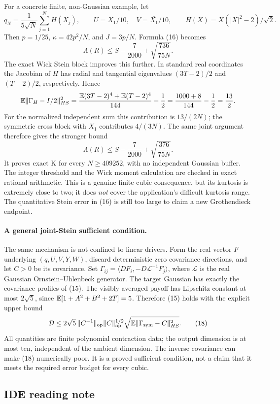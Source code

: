 For a concrete finite, non-Gaussian example, let
\[
 q_N=\frac1{5\sqrt N}\sum_{j=1}^N H(X_j),\qquad
 U=X_1/10,\quad V=\overline{X_1}/10,\qquad
 H(X)=X(|X|^2-2)/\sqrt2.
\]
Then $p=1/25$, $\kappa=42p^2/N$, and $J=3p/N$.
Formula (16) becomes
\[
 \Lambda(R)\le S-\frac7{2000}+\sqrt{\frac{736}{75N}}.
\]
The exact Wick Stein block improves this further. In standard real
coordinates the Jacobian of $H$ has radial and tangential eigenvalues
$(3T-2)/2$ and $(T-2)/2$, respectively. Hence
\[
 \mathbb E\|\Gamma_H-I/2\|_{HS}^2
 =\frac{\mathbb E(3T-2)^4+\mathbb E(T-2)^4}{144}-\frac12
 =\frac{1000+8}{144}-\frac12=\frac{13}{2}.
\]
For the normalized independent sum this contribution is $13/(2N)$;
the symmetric cross block with $X_1$ contributes $4/(3N)$.
The same joint argument therefore gives the stronger bound
\[
 \boxed{\Lambda(R)\le S-\frac7{2000}+\sqrt{\frac{376}{75N}}.}
\]
It proves exact K for every $N\ge409252$, with no independent
Gaussian buffer. The integer threshold and the Wick moment calculation
are checked in exact rational arithmetic. This is a genuine finite-cubic
consequence, but its kurtosis is extremely close to two; it does
\emph{not} cover the application's difficult kurtosis range.
The quantitative Stein error in (16) is still too large to claim a
new Grothendieck endpoint.

\paragraph{A general joint-Stein sufficient condition.}
The same mechanism is not confined to linear drivers. Form the real
vector $F$ underlying $(q,U,V,Y,W)$, discard deterministic zero
covariance directions, and let $C>0$ be its covariance. Set
$\Gamma_{ij}=\langle DF_i,-D\mathcal L^{-1}F_j\rangle$, where
$\mathcal L$ is the real Gaussian Ornstein--Uhlenbeck generator.
The target Gaussian has exactly the covariance profiles of (15).
The visibly averaged payoff has Lipschitz constant at most $2\sqrt5$,
since $\mathbb E[1+A^2+B^2+2T]=5$. Therefore (15) holds with the explicit
upper bound
\[
 \mathcal D\le2\sqrt5\,\|C^{-1}\|_{\rm op}\|C\|_{\rm op}^{1/2}
       \sqrt{\mathbb E\|\Gamma_{\rm sym}-C\|_{HS}^2}.              \tag{18}
\]
All quantities are finite polynomial contraction data; the output
dimension is at most ten, independent of the ambient dimension.
The inverse covariance can make (18) numerically poor. It is a proved
sufficient condition, not a claim that it meets the required error
budget for every cubic.

\subsection{IDE reading note}\label{sec:polar-reading}
